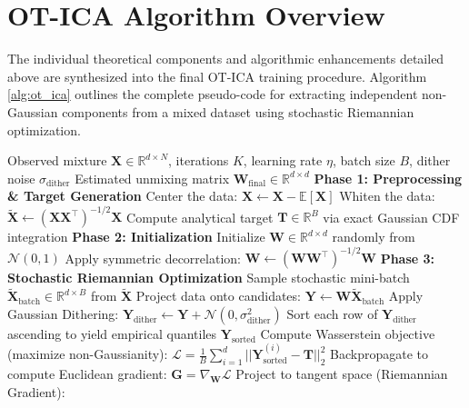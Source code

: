 \documentclass[12pt,a4paper,twoside,openany]{book}
\begin{document}
\section{OT-ICA Algorithm Overview}
The individual theoretical components and algorithmic enhancements detailed above are synthesized into the final OT-ICA training procedure. 
Algorithm \ref{alg:ot_ica} outlines the complete pseudo-code for extracting independent non-Gaussian components from a mixed dataset using stochastic Riemannian optimization.

\begin{algorithm}[H]
\caption{The Optimal Transport ICA (OT-ICA) Algorithm}
\label{alg:ot_ica}
\begin{algorithmic}[1]
\Require Observed mixture $\mathbf{X} \in \mathbb{R}^{d \times N}$, iterations $K$, learning rate $\eta$, batch size $B$, dither noise $\sigma_{\text{dither}}$
\Ensure Estimated unmixing matrix $\mathbf{W}_{\text{final}} \in \mathbb{R}^{d \times d}$
\State \textbf{Phase 1: Preprocessing \& Target Generation}
\State Center the data: $\mathbf{X} \gets \mathbf{X} - \mathbb{E}[\mathbf{X}]$
\State Whiten the data: $\widetilde{\mathbf{X}} \gets (\mathbf{X}\mathbf{X}^\top)^{-1/2} \mathbf{X}$ 
\State Compute analytical target $\mathbf{T} \in \mathbb{R}^{B}$ via exact Gaussian CDF integration
\State \textbf{Phase 2: Initialization}
\State Initialize $\mathbf{W} \in \mathbb{R}^{d \times d}$ randomly from $\mathcal{N}(0,1)$
\State Apply symmetric decorrelation:
\Statex \qquad $\mathbf{W} \gets (\mathbf{W}\mathbf{W}^\top)^{-1/2} \mathbf{W}$ 
\State \textbf{Phase 3: Stochastic Riemannian Optimization}
    \State Sample stochastic mini-batch $\widetilde{\mathbf{X}}_{\text{batch}} \in \mathbb{R}^{d \times B}$ from $\widetilde{\mathbf{X}}$
    \State Project data onto candidates: $\mathbf{Y} \gets \mathbf{W} \widetilde{\mathbf{X}}_{\text{batch}}$
    \State Apply Gaussian Dithering: $\mathbf{Y}_{\text{dither}} \gets \mathbf{Y} + \mathcal{N}(0, \sigma_{\text{dither}}^2)$
    \State Sort each row of $\mathbf{Y}_{\text{dither}}$ ascending to yield empirical quantiles $\mathbf{Y}_{\text{sorted}}$
    \State Compute Wasserstein objective (maximize non-Gaussianity):
    \Statex \qquad $\mathcal{L} = \frac{1}{B} \sum_{i=1}^{d} ||\mathbf{Y}_{\text{sorted}}^{(i)} - \mathbf{T}||_2^2$
    \State Backpropagate to compute Euclidean gradient: $\mathbf{G} = \nabla_{\mathbf{W}} \mathcal{L}$
    \State Project to tangent space (Riemannian Gradient): 

\end{algorithmic}
\end{algorithm}
\end{document}
